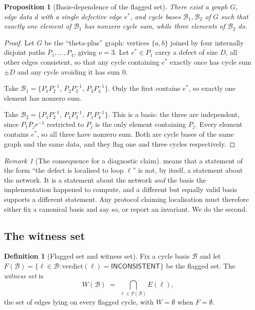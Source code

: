 \documentclass[11pt,twocolumn,a4paper]{article}
\theoremstyle{pstyle}
\newtheorem{proposition}[theorem]{Proposition}
\theoremstyle{definition}
\newtheorem{definition}[theorem]{Definition}
\theoremstyle{remark}
\newtheorem{remark}[theorem]{Remark}
\begin{document}
\begin{proposition}[Basis-dependence of the flagged set]
\label{prop:basis-localisation}
There exist a graph $G$, edge data $d$ with a single defective edge
$e^{\ast}$, and cycle bases $\mathcal{B}_1,\mathcal{B}_2$ of $G$ such
that exactly one element of $\mathcal{B}_1$ has nonzero cycle sum, while
three elements of $\mathcal{B}_2$ do.
\end{proposition}

\begin{proof}
Let $G$ be the ``theta-plus'' graph: vertices $\{a,b\}$ joined by four
internally disjoint paths $P_1,\dots,P_4$, giving
$\nu = 3$. Let $e^{\ast}\in P_1$ carry a defect of size $D$, all other
edges consistent, so that any cycle containing $e^{\ast}$ exactly once
has cycle sum $\pm D$ and any cycle avoiding it has sum $0$.

Take $\mathcal{B}_1 = \{P_1P_2^{-1},\,P_2P_3^{-1},\,P_3P_4^{-1}\}$.
Only the first contains $e^{\ast}$, so exactly one element has nonzero
sum.

Take $\mathcal{B}_2 = \{P_1P_2^{-1},\,P_1P_3^{-1},\,P_1P_4^{-1}\}$.
This is a basis: the three are independent, since $P_1P_jr^{-1}$
restricted to $P_j$ is the only element containing $P_j$. Every element
contains $e^{\ast}$, so all three have nonzero sum. Both are cycle bases
of the same graph and the same data, and they flag one and three cycles
respectively.
\end{proof}

\begin{remark}[The consequence for a diagnostic claim]
\label{rem:loc-consequence}
 means that a statement of the form
``the defect is localised to loop $\ell$'' is not, by itself, a
statement about the network. It is a statement about the network
\emph{and} the basis the implementation happened to compute, and a
different but equally valid basis supports a different statement. Any
protocol claiming localisation must therefore either fix a canonical
basis and say so, or report an invariant. We do the second.
\end{remark}

\subsection{The witness set}

\begin{definition}[Flagged set and witness set]
\label{def:witness}
Fix a cycle basis $\mathcal{B}$ and let
$F(\mathcal{B}) = \{\ell\in\mathcal{B} :
\mathrm{verdict}(\ell)=\textsf{INCONSISTENT}\}$ be the flagged set. The
\emph{witness set} is
\begin{equation}
  W(\mathcal{B}) \;=\; \bigcap_{\ell\in F(\mathcal{B})} E(\ell),
  \label{eq:witness}
\end{equation}
the set of edges lying on every flagged cycle, with
$W = \emptyset$ when $F=\emptyset$.
\end{definition}
\end{document}
